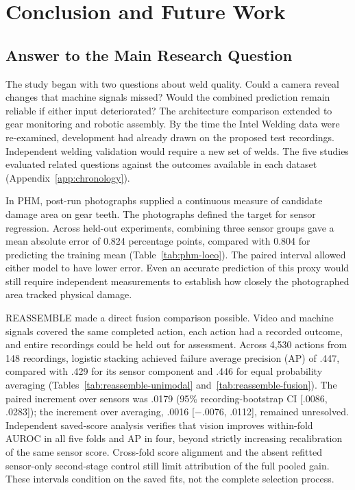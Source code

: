 \chapter{Conclusion and Future Work}
\label{ch:conclusion}

\section{Answer to the Main Research Question}
The study began with two questions about weld quality. Could a camera reveal changes
that machine signals missed? Would the combined prediction remain reliable if either
input deteriorated? The architecture comparison extended to gear monitoring and robotic
assembly. By the time the Intel Welding data were re-examined, development had already
drawn on the proposed test recordings. Independent welding validation would require a
new set of welds. The five studies evaluated related questions against the outcomes
available in each dataset (Appendix~\ref{app:chronology}).

In PHM, post-run photographs supplied a continuous measure of candidate damage area on
gear teeth. The photographs defined the target for sensor regression. Across held-out
experiments, combining three sensor groups gave a mean absolute error of 0.824
percentage points, compared with 0.804 for predicting the training mean
(Table~\ref{tab:phm-loeo}). The paired interval allowed either model to have lower
error. Even an accurate prediction of this proxy would still require independent
measurements to establish how closely the photographed area tracked physical damage.

REASSEMBLE made a direct fusion comparison possible. Video and machine signals covered
the same completed action, each action had a recorded outcome, and entire recordings
could be held out for assessment. Across 4,530 actions from 148 recordings, logistic
stacking achieved failure average precision (AP) of .447, compared with .429 for its
sensor component and .446 for equal probability averaging
(Tables~\ref{tab:reassemble-unimodal} and~\ref{tab:reassemble-fusion}). The paired
increment over sensors was .0179 (95\% recording-bootstrap CI [.0086, .0283]); the
increment over averaging, .0016 [$-.0076$, .0112], remained unresolved. Independent
saved-score analysis verifies that vision improves within-fold AUROC in all five folds
and AP in four, beyond strictly increasing recalibration of the same sensor score.
Cross-fold score alignment and the absent refitted sensor-only second-stage control
still limit attribution of the full pooled gain. These intervals condition on the saved
fits, not the complete selection process.

